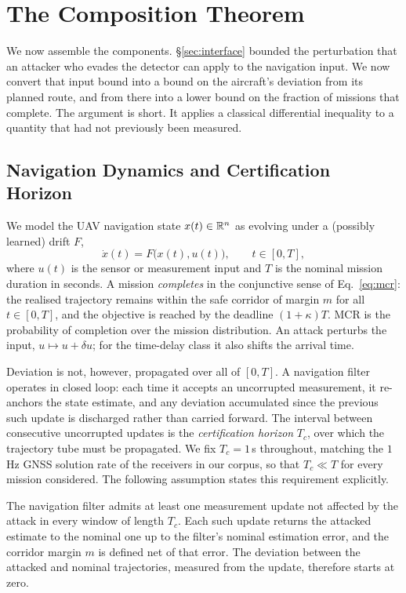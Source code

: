 \section{The Composition Theorem}
\label{sec:theorem}
We now assemble the components. \S\ref{sec:interface} bounded the
perturbation that an attacker who evades the detector can apply to the
navigation input. We now convert that input bound into a bound on the aircraft's
deviation from its planned route, and from there into a lower bound on the
fraction of missions that complete. The argument is short. It applies a
classical differential inequality to a quantity that had not previously been
measured.

\subsection{Navigation Dynamics and Certification Horizon}
We model the UAV navigation state $x(t)\in\mathbb{R}^n$ as evolving under a (possibly
learned) drift $F$,
\begin{equation}
\label{eq:ode}
\dot{x}(t) = F\big(x(t), u(t)\big), \qquad t\in[0,T],
\end{equation}
where $u(t)$ is the sensor or measurement input and $T$ is the nominal mission
duration in seconds. A mission \emph{completes} in the conjunctive sense of
Eq.~\eqref{eq:mcr}: the realised trajectory remains within the safe corridor of
margin $m$ for all $t\in[0,T]$, and the objective is reached by the deadline
$(1+\kappa)T$. MCR is the probability of completion over the mission
distribution. An attack perturbs the input, $u\mapsto u+\delta u$; for the
time-delay class it also shifts the arrival time.

Deviation is not, however, propagated over all of $[0,T]$. A navigation filter
operates in closed loop: each time it accepts an uncorrupted measurement, it
re-anchors the state estimate, and any deviation accumulated since the previous
such update is discharged rather than carried forward. The interval between
consecutive uncorrupted updates is the \emph{certification horizon} $T_c$, over
which the trajectory tube must be propagated. We fix $T_c=1$\,s throughout,
matching the $1$\,Hz GNSS solution rate of the receivers in our corpus, so that
$T_c\ll T$ for every mission considered. The following assumption states this
requirement explicitly.

\begin{definition}
\label{def:reanchor}
The navigation filter admits at least one measurement update not affected by the
attack in every window of length $T_c$. Each such update returns the attacked
estimate to the nominal one up to the filter's nominal estimation error, and the
corridor margin $m$ is defined net of that error. The deviation between the
attacked and nominal trajectories, measured from the update, therefore starts
at zero.
\end{definition}

